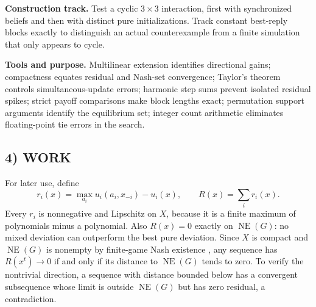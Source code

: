 \documentclass[11pt,a4paper]{article}
\newcommand{\NE}{\operatorname{NE}}
\theoremstyle{definition}
\theoremstyle{remark}
\begin{document}
\textbf{Construction track.} Test a cyclic $3\times3$ interaction, first with
synchronized beliefs and then with distinct pure initializations. Track constant
best-reply blocks exactly to distinguish an actual counterexample from a finite
simulation that only appears to cycle.

\textbf{Tools and purpose.} Multilinear extension identifies directional gains;
compactness equates residual and Nash-set convergence; Taylor's theorem controls
simultaneous-update errors; harmonic step sums prevent isolated residual spikes;
strict payoff comparisons make block lengths exact; permutation support arguments
identify the equilibrium set; integer count arithmetic eliminates floating-point
tie errors in the search.

\subsection*{4) WORK}
For later use, define
\[
 r_i(x)=\max_{a_i}u_i(a_i,x_{-i})-u_i(x),\qquad R(x)=\sum_i r_i(x).
\]
Every $r_i$ is nonnegative and Lipschitz on $X$, because it is a finite maximum
of polynomials minus a polynomial. Also $R(x)=0$ exactly on $\NE(G)$: no mixed
deviation can outperform the best pure deviation. Since $X$ is compact and
$\NE(G)$ is nonempty by finite-game Nash existence \cite{nash}, any sequence has
$R(x^t)\to0$ if and only if its distance to $\NE(G)$ tends to zero. To verify the
nontrivial direction, a sequence with distance bounded below has a convergent
subsequence whose limit is outside $\NE(G)$ but has zero residual, a contradiction.
\end{document}
